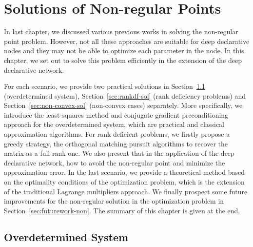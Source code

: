 \chapter{Solutions of Non-regular Points}
\label{cha:result}
In last chapter, we discussed various previous works in solving the non-regular point problem. However, not all these approaches are suitable for deep declarative nodes and they may not be able to optimize each parameter in the node. In this chapter, we set out to solve this problem efficiently in the extension of the deep declarative network. 
\par For each scenario, we provide two practical solutions in Section~\ref{sec:overdet-sol} (overdetermined system), Section~\ref{sec:rankdf-sol} (rank deficiency problems) and Section~\ref{sec:non-convex-sol} (non-convex cases) separately. More specifically, we introduce the least-squares method and conjugate gradient preconditioning approach for the overdetermined system, which are practical and classical approximation algorithms. For rank deficient problems, we firstly propose a greedy strategy, the orthogonal matching pursuit algorithms to recover the matrix as a full rank one. We also present that in the application of the deep declarative network, how to avoid the non-regular point and minimize the approximation error. In the last scenario, we provide a theoretical method based on the optimality conditions of the optimization problem, which is the extension of the traditional Lagrange multipliers approach. We finally prospect some future improvements for the non-regular solution in the optimization problem in Section~\ref{sec:futurework-non}. The summary of this chapter is given at the end. 

\section{Overdetermined System}
\label{sec:overdet-sol}
